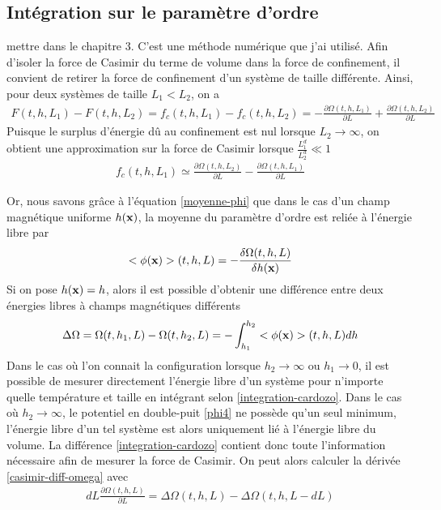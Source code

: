     \subsection{Intégration sur le paramètre d'ordre}
{\color{red} mettre dans le chapitre 3. C'est une méthode numérique que j'ai utilisé.}
Afin d'isoler la force de Casimir du terme de volume dans la force de confinement, il convient de retirer la force de confinement d'un système de taille différente. Ainsi, pour deux systèmes de taille $L_1 \less L_2$, on a 
\begin{align}
    F(t,h,L_1) - F(t,h,L_2) = f_c(t,h,L_1) - f_c(t,h,L_2) =  - \frac{\partial \Omega(t,h,L_1)}{\partial L}  + \frac{\partial \Omega(t,h,L_2)}{\partial L} 
\end{align}
Puisque le surplus d'énergie dû au confinement est nul lorsque $L_2\to \infty$, on obtient une approximation sur la force de Casimir lorsque $\frac{L_1^d}{L_2^d} \ll 1$ 
\begin{align}
    f_c(t,h,L_1) \simeq  \frac{\partial \Omega(t,h,L_2)}{\partial L}  - \frac{\partial \Omega(t,h,L_1)}{\partial L} 
    \label{casimir-diff-omega}   
\end{align}

Or, nous savons grâce à l'équation \ref{moyenne-phi} que dans le cas d'un champ magnétique uniforme $h({\bf x})$, la moyenne du paramètre d'ordre est reliée à l'énergie libre par
\begin{align}
    <\phi({\bf x})>(t,h,L) = - \frac{\delta \Omega(t,h,L)}{\delta h({\bf x})}
\end{align} 
Si on pose $h({\bf x}) = h$, alors il est possible d'obtenir une différence entre deux énergies libres à champs magnétiques différents \cite{lopes_cardozo_critical_2014} 
\begin{align}
    \Delta \Omega = \Omega(t,h_1,L) - \Omega(t,h_2,L) = - \int_{h_1}^{h_2} <\phi({\bf x})>(t,h,L) dh
    \label{integration-cardozo}
\end{align}
Dans le cas où l'on connait la configuration lorsque $h_2 \to \infty$ ou $h_1 \to 0$, il est possible de mesurer directement l'énergie libre d'un système pour n'importe quelle température et taille en intégrant selon \ref{integration-cardozo}. Dans le cas où $h_2 \to \infty$, le potentiel en double-puit \ref{phi4} ne possède qu'un seul minimum, l'énergie libre d'un tel système est alors uniquement lié à l'énergie libre du volume.
La différence \ref{integration-cardozo} contient donc toute l'information nécessaire afin de mesurer la force de Casimir. On peut alors calculer la dérivée \ref{casimir-diff-omega} avec
\begin{align}
    dL \frac{\partial \Omega(t,h,L)}{\partial L} = \Delta \Omega(t,h,L)-\Delta \Omega(t,h,L-dL)
\end{align}


